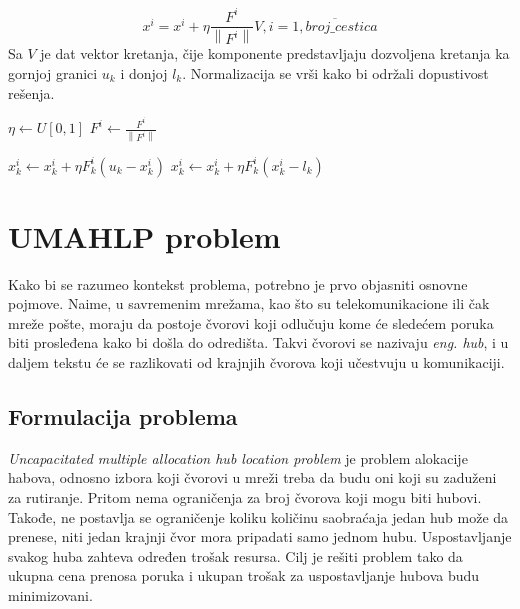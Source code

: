 \documentclass[a4paper]{article}
\newcommand{\norm}[1]{\left\lVert#1\right\rVert}
\begin{document}
\begin{equation}
\label{eq:pomeranje}
x^i = x^i + \eta \frac{F^i}{\norm{F^i}} V,i = \overline{1, broj\_cestica}
\end{equation}
Sa $V$ je dat vektor kretanja, čije komponente predstavljaju dozvoljena kretanja ka gornjoj granici $u_k$ i donjoj $l_k$. Normalizacija se vrši kako bi održali dopustivost rešenja.


\begin{algorithm}[H]
\label{alg:pomeri}
\caption{$pomeri()$}
\begin{algorithmic}[1]

\STATE $\eta \leftarrow \textit{U}[0, 1]$
\STATE $F^i \leftarrow \frac{F^i}{\norm{F^i}}$

\STATE $x_k^i \leftarrow x_k^i + \eta F^i_k (u_k - x_k^i)$
\ELSE
\STATE $x_k^i \leftarrow x_k^i + \eta F^i_k (x_k^i - l_k)$
\ENDIF
\ENDFOR
\ENDIF
\ENDFOR
\end{algorithmic}
\end{algorithm}

\section{UMAHLP problem}
\label{sec:umahlp}
Kako bi se razumeo kontekst problema, potrebno je prvo objasniti osnovne pojmove. Naime, u savremenim mrežama, kao što su telekomunikacione ili čak mreže pošte, moraju da postoje čvorovi koji odlučuju kome će sledećem poruka biti prosleđena kako bi došla do odredišta. Takvi čvorovi se nazivaju \textit{eng. hub}, i u daljem tekstu će se razlikovati od krajnjih čvorova koji učestvuju u komunikaciji.

\subsection{Formulacija problema}
\label{subsec:formulacija}
\textit{Uncapacitated multiple allocation hub location problem} je problem alokacije habova, odnosno izbora koji čvorovi u mreži treba da budu oni koji su zaduženi za rutiranje. Pritom nema ograničenja za broj čvorova koji mogu biti hubovi. Takođe, ne postavlja se ograničenje koliku količinu saobraćaja jedan hub može da prenese, niti jedan krajnji čvor mora pripadati samo jednom hubu. Uspostavljanje svakog huba zahteva određen trošak resursa. Cilj je rešiti problem tako da ukupna cena prenosa poruka i ukupan trošak za uspostavljanje hubova budu minimizovani.
\end{document}
